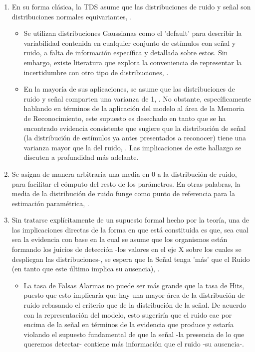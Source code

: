 \begin{enumerate}
\item En su forma clásica, la TDS asume que las distribuciones de ruido y señal son distribuciones normales equivariantes, \parencite{Stainslaw1999}.\\
  \begin{itemize}
  \item Se utilizan distribuciones Gaussianas como el 'default' para describir la variabilidad contenida en cualquier conjunto de estímulos con señal y ruido, a falta de información específica y detallada sobre estos. Sin embargo, existe literatura que explora la conveniencia de representar la incertidumbre con otro tipo de distribuciones, \parencite{Wickens, WeijiMa2010}.\\
  \item En la mayoría de sus aplicaciones, se asume que las distribuciones de ruido y señal comparten una varianza de 1, \parencite{Tanner1954}. No obstante, específicamente hablando en términos de la aplicación del modelo al área de la Memoria de Reconocimiento, este supuesto es desechado en tanto que se ha encontrado evidencia consistente que sugiere que la distribución de señal (la distribución de estímulos ya antes presentados a reconocer) tiene una varianza mayor que la del ruido, \parencite{Wixted2007}. Las implicaciones de este hallazgo se discuten a profundidad más adelante.\\
  \end{itemize}
\item Se asigna de manera arbitraria una media en 0 a la distribución de ruido, para facilitar el cómputo del resto de los parámetros. En otras palabras, la media de la distribución de ruido funge como punto de referencia para la estimación paramétrica, \parencite{Wickens, Gescheider}.\\
\item Sin tratarse explícitamente de un supuesto formal hecho por la teoría, una de las implicaciones directas de la forma en que está constituida es que, sea cual sea la evidencia con base en la cual se asume que los organismos están formando los juicios de detección -los valores en el eje X sobre los cuales se despliegan las distribuciones-, se espera que la Señal tenga 'más' que el Ruido (en tanto que este último implica su ausencia), \parencite{Stainslaw1999}.\\
  \begin{itemize}
  \item La tasa de Falsas Alarmas no puede ser más grande que la tasa de Hits, puesto que esto implicaría que hay una mayor área de la distribución de ruido rebasando el criterio que de la distribución de la señal. De acuerdo con la representación del modelo, esto sugeriría que el ruido cae por encima de la señal en términos de la evidencia que produce y estaría violando el supuesto fundamental de que la señal -la presencia de lo que queremos detectar- contiene más información que el ruido -su ausencia-.\\
  \end{itemize}
\end{enumerate}

